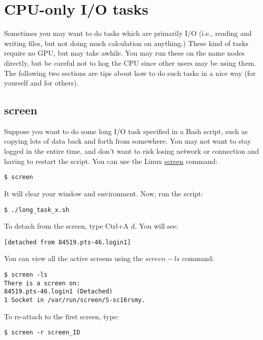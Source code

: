 \documentclass[]{article}
\begin{document}
\section{CPU-only I/O tasks}

Sometimes you may want to do tasks which are primarily I/O (i.e., reading and writing files, but not doing much calculation on anything.) These kind of tasks require no GPU, but may take awhile. You may run these on the name nodes directly, but be careful not to hog the CPU since other users may be using them. The following two sections are tips about how to do such tasks in a nice way (for yourself and for others).

\subsection{screen}

Suppose you want to do some long I/O task specified in a Bash script, such as copying lots of data back and forth from somewhere. You may not want to stay logged in the entire time, and don't want to risk losing network or connection and having to restart the script. You can use the Linux \href{https://www.rackaid.com/blog/linux-screen-tutorial-and-how-to/}{screen} command:

\begin{lstlisting}
$ screen
\end{lstlisting}

It will clear your window and environment. Now, run the script:

\begin{lstlisting}
$ ./long_task_x.sh
\end{lstlisting}

To detach from the screen, type Ctrl+A d. You will see:

\begin{lstlisting}
[detached from 84519.pts-46.login1]
\end{lstlisting}

You can view all the active screens using the \(screen -ls\) command:
\begin{lstlisting}
$ screen -ls
There is a screen on:
84519.pts-46.login1	(Detached)
1 Socket in /var/run/screen/S-sc16rsmy.
\end{lstlisting}

To re-attach to the first screen, type:
\begin{lstlisting}
$ screen -r screen_ID
\end{lstlisting}
\end{document}
